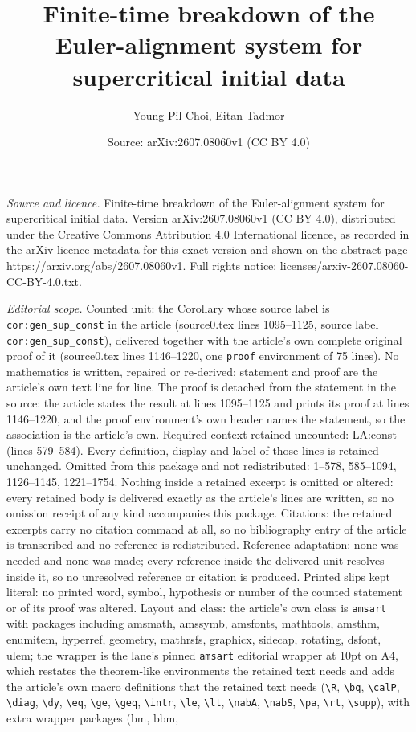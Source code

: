 \documentclass[10pt,a4paper]{amsart}
\title[Finite-time breakdown of the Euler-alignment system for supe]{Finite-time breakdown of the Euler-alignment system for supercritical initial data}
\author{Young-Pil Choi, Eitan Tadmor}
\date{Source: arXiv:2607.08060v1 (CC BY 4.0)}
\begin{document}
\maketitle

\noindent\emph{Source and licence.} Finite-time breakdown of the Euler-alignment system for supercritical initial data. Version arXiv:2607.08060v1 (CC BY 4.0), distributed under the Creative Commons Attribution 4.0 International licence, as recorded in the arXiv licence metadata for this exact version and shown on the abstract page https://arxiv.org/abs/2607.08060v1. Full rights notice: licenses/arxiv-2607.08060-CC-BY-4.0.txt.\par\smallskip

\noindent\textit{Editorial scope.} Counted unit: the Corollary whose source label is \texttt{cor:gen\_sup\_const} in the article (source0.tex lines 1095--1125, source label \texttt{cor:gen\_sup\_const}), delivered together with the article's own complete original proof of it (source0.tex lines 1146--1220, one \texttt{proof} environment of 75 lines). No mathematics is written, repaired or re-derived: statement and proof are the article's own text line for line. The proof is detached from the statement in the source: the article states the result at lines 1095--1125 and prints its proof at lines 1146--1220, and the proof environment's own header names the statement, so the association is the article's own. Required context retained uncounted: LA:const (lines 579--584). Every definition, display and label of those lines is retained unchanged. Omitted from this package and not redistributed: 1--578, 585--1094, 1126--1145, 1221--1754. Nothing inside a retained excerpt is omitted or altered: every retained body is delivered exactly as the article's lines are written, so no omission receipt of any kind accompanies this package. Citations: the retained excerpts carry no citation command at all, so no bibliography entry of the article is transcribed and no reference is redistributed. Reference adaptation: none was needed and none was made; every reference inside the delivered unit resolves inside it, so no unresolved reference or citation is produced. Printed slips kept literal: no printed word, symbol, hypothesis or number of the counted statement or of its proof was altered. Layout and class: the article's own class is \texttt{amsart} with packages including amsmath, amssymb, amsfonts, mathtools, amsthm, enumitem, hyperref, geometry, mathrsfs, graphicx, sidecap, rotating, dsfont, ulem; the wrapper is the lane's pinned \texttt{amsart} editorial wrapper at 10pt on A4, which restates the theorem-like environments the retained text needs and adds the article's own macro definitions that the retained text needs (\texttt{\textbackslash R}, \texttt{\textbackslash bq}, \texttt{\textbackslash calP}, \texttt{\textbackslash diag}, \texttt{\textbackslash dy}, \texttt{\textbackslash eq}, \texttt{\textbackslash ge}, \texttt{\textbackslash geq}, \texttt{\textbackslash intr}, \texttt{\textbackslash le}, \texttt{\textbackslash lt}, \texttt{\textbackslash nabA}, \texttt{\textbackslash nabS}, \texttt{\textbackslash pa}, \texttt{\textbackslash rt}, \texttt{\textbackslash supp}), with extra wrapper packages (bm, bbm, 
\end{document}
